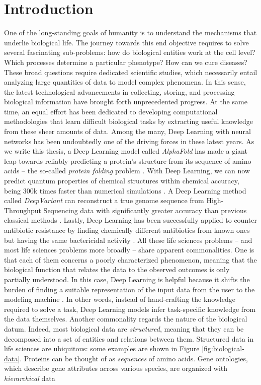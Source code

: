 
\chapter{Introduction}\label{ch:introduction}
One of the long-standing goals of humanity is to understand the mechanisms that underlie biological life. The journey towards this end objective requires to solve several fascinating sub-problems: how do biological entities work at the cell level? Which processes determine a particular phenotype? How can we cure diseases? These broad questions require dedicated scientific studies, which necessarily entail analyzing large quantities of data to model complex phenomena. In this sense, the latest technological advancements in collecting, storing, and processing biological information have brought forth unprecedented progress. At the same time, an equal effort has been dedicated to developing computational methodologies that learn difficult biological tasks by extracting useful knowledge from these sheer amounts of data. Among the many, Deep Learning with neural networks \citep{lecun2015naturedeeplearning} has been undoubtedly one of the driving forces in these latest years. As we write this thesis, a Deep Learning model called \emph{AlphaFold} has made a giant leap towards reliably predicting a protein's structure from its sequence of amino acids -- the so-called \emph{protein folding} problem \citep{senior2020alphafold}. With Deep Learning, we can now predict quantum properties of chemical structures within chemical accuracy, being 300k times faster than numerical simulations  \citep{gilmer2017neuralmessagepassing}. A Deep Learning method called \emph{DeepVariant} can reconstruct a true genome sequence from High-Throughput Sequencing data with significantly greater accuracy than previous classical methods \citep{poplin2018deepvariant}. Lastly, Deep Learning has been successfully applied to counter antibiotic resistance by finding chemically different antibiotics from known ones but having the same bactericidal activity \citep{stokes2020deeplearningantibiotic}. All these life sciences problems -- and most life sciences problems more broadly -- share apparent commonalities. One is that each of them concerns a poorly characterized phenomenon, meaning that the biological function that relates the data to the observed outcomes is only partially understood. In this case, Deep Learning is helpful because it shifts the burden of finding a suitable representation of the input data from the user to the modeling machine \citep{bengio2014representationlearning}. In other words, instead of hand-crafting the knowledge required to solve a task, Deep Learning models infer task-specific knowledge from the data themselves. Another commonality regards the nature of the biological datum. Indeed, most biological data are \emph{structured}, meaning that they can be decomposed into a set of entities and relations between them. Structured data in life sciences are ubiquitous: some examples are shown in Figure \ref{fig:biological-data}. Proteins can be thought of as \emph{sequences} of amino acids. Gene ontologies, which describe gene attributes across various species, are organized with \emph{hierarchical} data 